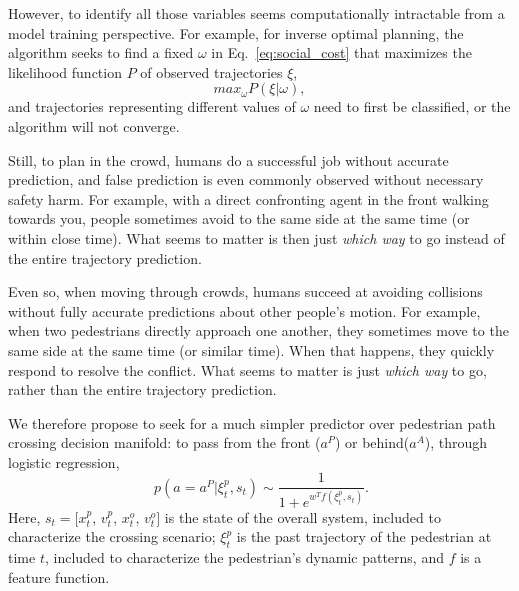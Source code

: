 \documentclass[conference]{IEEEtran}
\begin{document}
However, to identify all those variables seems computationally intractable 
from a model training perspective. For example, for inverse optimal planning, 
the algorithm seeks to find a fixed $\omega$ in 
Eq.~\ref{eq:social_cost} that maximizes the likelihood function $P$ of 
observed trajectories $\xi$,
\begin{equation}
  max_{\omega} P(\xi|\omega),
\end{equation}
and trajectories representing different values of $\omega$ need to first be 
classified, or the algorithm will not converge. 

Still, to plan in the crowd, humans do a successful job without accurate 
prediction, and false prediction is even commonly observed without necessary 
safety harm. For example, with a direct confronting agent in the front walking 
towards you, people sometimes avoid to the same side at the same time (or 
within close time). What seems to matter is then just \textit{which way} 
to go instead of the entire trajectory prediction. 

 Even so, when moving through crowds, humans
succeed at avoiding collisions without fully accurate predictions
about other people's motion. For example, when two pedestrians
directly approach one another, they sometimes move to the same side at
the same time (or similar time).  When that happens, they quickly
respond to resolve the conflict.  What seems to matter is just
\textit{which way} to go, rather than the entire trajectory
prediction.

We therefore propose to seek for a much simpler predictor over pedestrian path 
crossing decision manifold: to pass from the front ($a^P$) or behind($a^A$), 
through logistic regression,
\begin{equation}~\label{eq:logi}
p(a=a^P|\xi^p_t, s_t) \sim \frac{1}{1+e^{w^Tf(\xi^p_t, s_t)}}.
\end{equation}
Here, $s_t = [x^p_t$, $v^p_t$, $x^o_t$, $v^o_t]$ is the state of the overall 
system, included to characterize the crossing scenario;  $\xi^p_t$ is the past 
trajectory of the pedestrian at time $t$, included to characterize the 
pedestrian's dynamic patterns, and $f$ is a feature function.

\end{document}
